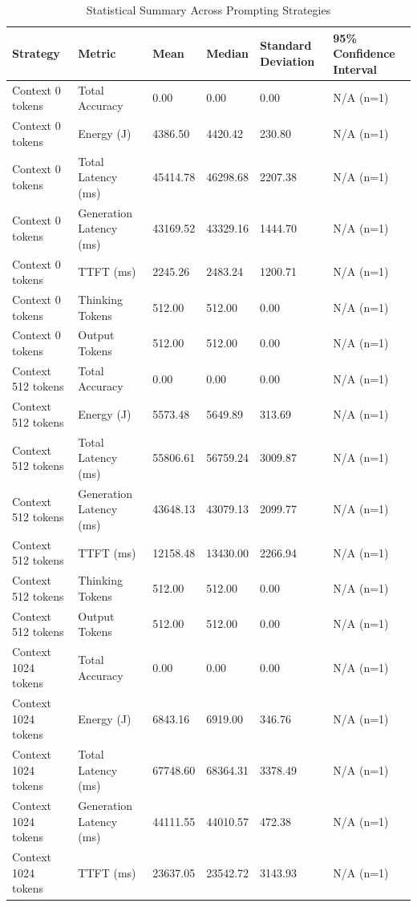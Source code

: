 \begin{table}
\caption{Statistical Summary Across Prompting Strategies}
\label{tab:statistical_summary}
\begin{tabular}{llllll}
\toprule
Strategy & Metric & Mean & Median & Standard Deviation & 95\% Confidence Interval \\
\midrule
Context 0 tokens & Total Accuracy & 0.00 & 0.00 & 0.00 & N/A (n=1) \\
Context 0 tokens & Energy (J) & 4386.50 & 4420.42 & 230.80 & N/A (n=1) \\
Context 0 tokens & Total Latency (ms) & 45414.78 & 46298.68 & 2207.38 & N/A (n=1) \\
Context 0 tokens & Generation Latency (ms) & 43169.52 & 43329.16 & 1444.70 & N/A (n=1) \\
Context 0 tokens & TTFT (ms) & 2245.26 & 2483.24 & 1200.71 & N/A (n=1) \\
Context 0 tokens & Thinking Tokens & 512.00 & 512.00 & 0.00 & N/A (n=1) \\
Context 0 tokens & Output Tokens & 512.00 & 512.00 & 0.00 & N/A (n=1) \\
Context 512 tokens & Total Accuracy & 0.00 & 0.00 & 0.00 & N/A (n=1) \\
Context 512 tokens & Energy (J) & 5573.48 & 5649.89 & 313.69 & N/A (n=1) \\
Context 512 tokens & Total Latency (ms) & 55806.61 & 56759.24 & 3009.87 & N/A (n=1) \\
Context 512 tokens & Generation Latency (ms) & 43648.13 & 43079.13 & 2099.77 & N/A (n=1) \\
Context 512 tokens & TTFT (ms) & 12158.48 & 13430.00 & 2266.94 & N/A (n=1) \\
Context 512 tokens & Thinking Tokens & 512.00 & 512.00 & 0.00 & N/A (n=1) \\
Context 512 tokens & Output Tokens & 512.00 & 512.00 & 0.00 & N/A (n=1) \\
Context 1024 tokens & Total Accuracy & 0.00 & 0.00 & 0.00 & N/A (n=1) \\
Context 1024 tokens & Energy (J) & 6843.16 & 6919.00 & 346.76 & N/A (n=1) \\
Context 1024 tokens & Total Latency (ms) & 67748.60 & 68364.31 & 3378.49 & N/A (n=1) \\
Context 1024 tokens & Generation Latency (ms) & 44111.55 & 44010.57 & 472.38 & N/A (n=1) \\
Context 1024 tokens & TTFT (ms) & 23637.05 & 23542.72 & 3143.93 & N/A (n=1) \\

\end{tabular}
\end{table}
